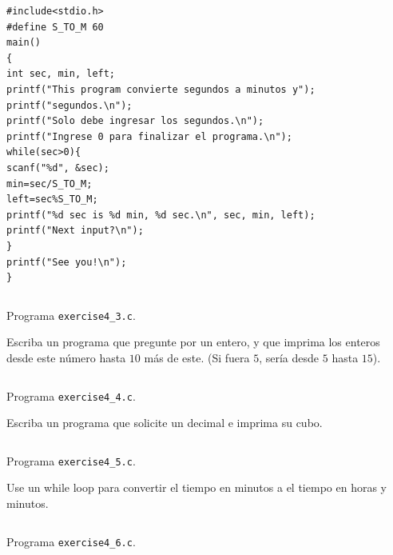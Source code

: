 \documentclass[spanish,addpoints,answers,a4paper]{exam}
\begin{document}
\begin{questions}
\begin{verbatim}
#include<stdio.h>
#define S_TO_M 60
main()
{
int sec, min, left;
printf("This program convierte segundos a minutos y");
printf("segundos.\n");
printf("Solo debe ingresar los segundos.\n");
printf("Ingrese 0 para finalizar el programa.\n");
while(sec>0){
scanf("%d", &sec);
min=sec/S_TO_M;
left=sec%S_TO_M;
printf("%d sec is %d min, %d sec.\n", sec, min, left);
printf("Next input?\n");
}
printf("See you!\n");
}
\end{verbatim}

\begin{solution}
	
\begin{listing}[H]
	\footnotesize
	\inputminted{c}{exercise4_3.c}
	\caption{Programa \texttt{exercise4\_3.c}.}
	\label{lst:4.3}
\end{listing}
\end{solution}

\question Escriba un programa que pregunte por un entero, y que imprima los enteros desde este número hasta $10$ más de este. (Si fuera $5$, sería desde $5$ hasta $15$).

\begin{solution}

\begin{listing}[H]
	\footnotesize
	\inputminted{c}{exercise4_4.c}
	\caption{Programa \texttt{exercise4\_4.c}.}
	\label{lst:4.4}
\end{listing}
\end{solution}

\question Escriba un programa que solicite un decimal e imprima su cubo.

\begin{solution}
	
\begin{listing}[H]
	\footnotesize
	\inputminted{c}{exercise4_5.c}
	\caption{Programa \texttt{exercise4\_5.c}.}
	\label{lst:4.5}
\end{listing}
\end{solution}

\question Use un while loop para convertir el tiempo en minutos a el tiempo en horas y minutos.

\begin{solution}
	
\begin{listing}[H]
	\footnotesize
	\inputminted{c}{exercise4_6.c}
	\caption{Programa \texttt{exercise4\_6.c}.}
	\label{lst:4.6}
\end{listing}
\end{solution}


\end{questions}
\end{document}
